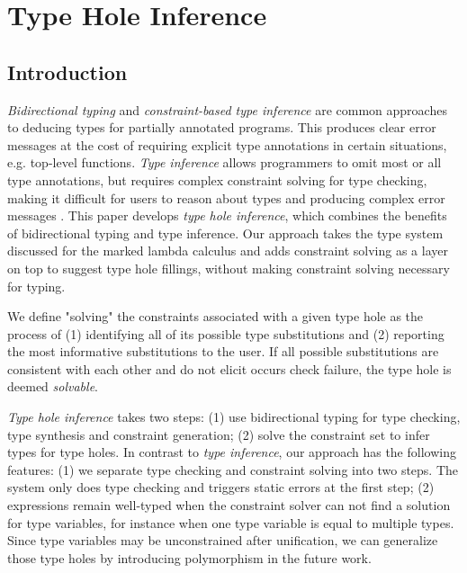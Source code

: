 



\section{Type Hole Inference}
\subsection{Introduction}
\label{sec:intro}
\emph{Bidirectional typing} and \emph{constraint-based type inference} are common approaches to deducing types for partially annotated programs. 
This produces clear error messages at the cost of requiring explicit type annotations in certain situations, e.g. top-level functions. \emph{Type inference} allows programmers to omit most or all type annotations, but requires complex constraint solving for type checking, making it difficult for users to reason about types and producing complex error messages \cite{typeinferDif}.
This paper develops \emph{type hole inference}, which combines the benefits of bidirectional typing and type inference. Our approach takes the type system discussed for the marked lambda calculus and adds constraint solving as a layer on top to suggest type hole fillings, without making constraint solving necessary for typing. 

We define "solving" the constraints associated with a given type hole as the process of (1) identifying all of its possible type substitutions and (2) reporting the most informative substitutions to the user. If all possible substitutions are consistent with each other and do not elicit occurs check failure, the type hole is deemed \emph{solvable}.

\emph{Type hole inference} takes two steps: (1) use bidirectional typing for type checking, type synthesis and constraint generation; (2) solve the constraint set to infer types for type holes. In contrast to \emph{type inference}, our approach has the following features: (1) we separate type checking and constraint solving into two steps. The system only does type checking and triggers static errors at the first step; (2) expressions remain well-typed when the constraint solver can not find a solution for type variables, for instance when one type variable is equal to multiple types. Since  type variables may be unconstrained after unification, we can generalize those type holes by introducing polymorphism in the future work. 

